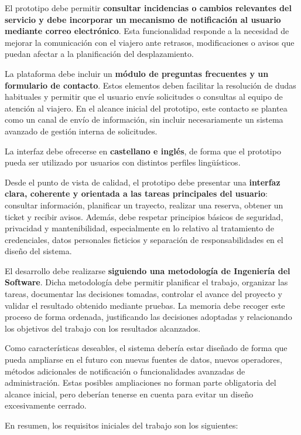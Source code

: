 El prototipo debe permitir \textbf{consultar incidencias o cambios relevantes del servicio y debe incorporar un mecanismo de notificación al usuario mediante correo electrónico}. Esta funcionalidad responde a la necesidad de mejorar la comunicación con el viajero ante retrasos, modificaciones o avisos que puedan afectar a la planificación del desplazamiento.

La plataforma debe incluir un \textbf{módulo de preguntas frecuentes y un formulario de contacto}. Estos elementos deben facilitar la resolución de dudas habituales y permitir que el usuario envíe solicitudes o consultas al equipo de atención al viajero. En el alcance inicial del prototipo, este contacto se plantea como un canal de envío de información, sin incluir necesariamente un sistema avanzado de gestión interna de solicitudes.

La interfaz debe ofrecerse en \textbf{castellano e inglés}, de forma que el prototipo pueda ser utilizado por usuarios con distintos perfiles lingüísticos.

Desde el punto de vista de calidad, el prototipo debe presentar una \textbf{interfaz clara, coherente y orientada a las tareas principales del usuario}: consultar información, planificar un trayecto, realizar una reserva, obtener un ticket y recibir avisos. Además, debe respetar principios básicos de seguridad, privacidad y mantenibilidad, especialmente en lo relativo al tratamiento de credenciales, datos personales ficticios y separación de responsabilidades en el diseño del sistema.

El desarrollo debe realizarse \textbf{siguiendo una metodología de Ingeniería del Software}. Dicha metodología debe permitir planificar el trabajo, organizar las tareas, documentar las decisiones tomadas, controlar el avance del proyecto y validar el resultado obtenido mediante pruebas. La memoria debe recoger este proceso de forma ordenada, justificando las decisiones adoptadas y relacionando los objetivos del trabajo con los resultados alcanzados.

Como características deseables, el sistema debería estar diseñado de forma que pueda ampliarse en el futuro con nuevas fuentes de datos, nuevos operadores, métodos adicionales de notificación o funcionalidades avanzadas de administración. Estas posibles ampliaciones no forman parte obligatoria del alcance inicial, pero deberían tenerse en cuenta para evitar un diseño excesivamente cerrado.

En resumen, los requisitos iniciales del trabajo son los siguientes:

